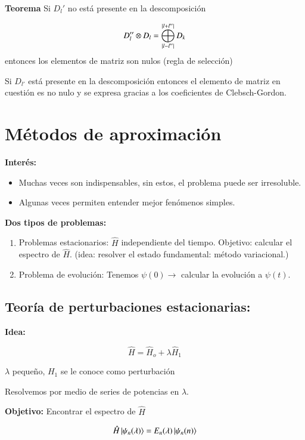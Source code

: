 \textbf{Teorema} Si $D_l'$ no está presente en la descomposición 

$$
D_l''\otimes D_l = \bigoplus_{\abs*{l-l''}}^{\abs{l+l''}}D_k
$$
 entonces los elementos de matriz son nulos (regla de selección)

 Si $D_{l'}$ está presente en la descomposición entonces el elemento de matriz en cuestión es no nulo y se expresa gracias a los coeficientes de Clebsch-Gordon.

 

 \chapter{Métodos de aproximación}

 \textbf{Interés:}
 \begin{itemize}
     \item Muchas veces son indispensables, sin estos, el problema puede ser irresoluble.
     \item Algunas veces permiten entender mejor fenómenos simples.
 \end{itemize}

 \textbf{Dos tipos de problemas:}

 \begin{enumerate}
     \item Problemas estacionarios: $\hat{H}$ independiente del tiempo. Objetivo: calcular el espectro de $\hat{H}$. (idea: resolver el estado fundamental: método variacional.)
     \item Problema de evolución: Tenemos $\psi(0)\rightarrow$ calcular la evolución a $\psi(t)$.
 \end{enumerate}


\section{Teoría de perturbaciones estacionarias:}

\textbf{Idea:} 

$$\hat{H}=\hat{H}_o+\lambda\hat{H}_1$$

$\lambda$ pequeño, $H_1$ se le conoce como perturbación

Resolvemos por medio de series de potencias en $\lambda$.

\textbf{Objetivo:} Encontrar el espectro de $\hat{H}$

\begin{align*}
    \hat{H}\ket{\psi_n(\lambda)}=E_n(\lambda)\ket{\psi_n(n)}
\end{align*}

